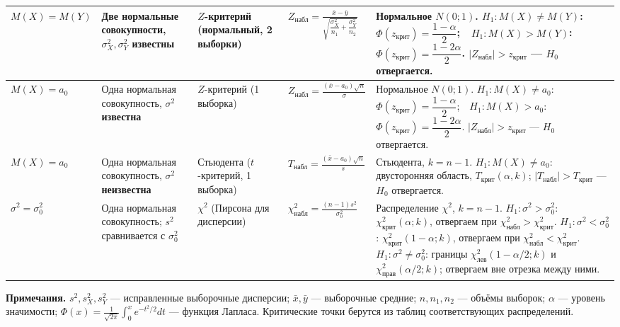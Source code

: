 \documentclass[a4paper,landscape,9pt]{extarticle}
\newcommand{\kr}{\text{крит}}
\newcommand{\nab}{\text{набл}}
\begin{document}
\begin{tabular}{@{}P{2.4cm}P{3.7cm}P{2.7cm}P{6.3cm}P{9.3cm}@{}}
\midrule
$M(X)=M(Y)$ &
Две нормальные совокупности, $\sigma_X^2,\sigma_Y^2$ \textbf{известны} &
$Z$-критерий (нормальный, 2 выборки) &
$\displaystyle Z_{\nab}=\frac{\bar x-\bar y}{\sqrt{\dfrac{\sigma_X^2}{n_1}+\dfrac{\sigma_Y^2}{n_2}}}$ &
Нормальное $N(0;1)$. $H_1: M(X)\ne M(Y)$: $\Phi(z_{\kr})=\dfrac{1-\alpha}{2}$;\ \ $H_1: M(X)>M(Y)$: $\Phi(z_{\kr})=\dfrac{1-2\alpha}{2}$.\newline
$|Z_{\nab}|>z_{\kr}$ --- $H_0$ отвергается. \\
\midrule
$M(X)=a_0$ &
Одна нормальная совокупность, $\sigma^2$ \textbf{известна} &
$Z$-критерий (1 выборка) &
$\displaystyle Z_{\nab}=\frac{(\bar x-a_0)\sqrt n}{\sigma}$ &
Нормальное $N(0;1)$. $H_1: M(X)\ne a_0$: $\Phi(z_{\kr})=\dfrac{1-\alpha}{2}$;\ \ $H_1: M(X)>a_0$: $\Phi(z_{\kr})=\dfrac{1-2\alpha}{2}$.\newline
$|Z_{\nab}|>z_{\kr}$ --- $H_0$ отвергается. \\
\midrule
$M(X)=a_0$ &
Одна нормальная совокупность, $\sigma^2$ \textbf{неизвестна} &
Стьюдента ($t$-критерий, 1 выборка) &
$\displaystyle T_{\nab}=\frac{(\bar x-a_0)\sqrt n}{s}$ &
Стьюдента, $k=n-1$. $H_1: M(X)\ne a_0$: двусторонняя область, $T_{\kr}(\alpha,k)$; $|T_{\nab}|>T_{\kr}$ --- $H_0$ отвергается. \\
\midrule
$\sigma^2=\sigma_0^2$ &
Одна нормальная совокупность; $s^2$ сравнивается с $\sigma_0^2$ &
$\chi^2$ (Пирсона для дисперсии) &
$\displaystyle \chi^2_{\nab}=\frac{(n-1)s^2}{\sigma_0^2}$ &
Распределение $\chi^2$, $k=n-1$.\newline
$H_1:\sigma^2>\sigma_0^2$: $\chi^2_{\kr}(\alpha;k)$, отвергаем при $\chi^2_{\nab}>\chi^2_{\kr}$.\newline
$H_1:\sigma^2<\sigma_0^2$: $\chi^2_{\kr}(1-\alpha;k)$, отвергаем при $\chi^2_{\nab}<\chi^2_{\kr}$.\newline
$H_1:\sigma^2\ne\sigma_0^2$: границы $\chi^2_{\text{лев}}(1-\alpha/2;k)$ и $\chi^2_{\text{прав}}(\alpha/2;k)$; отвергаем вне отрезка между ними. \\
\bottomrule
\end{tabular}

\vspace{4pt}
{\scriptsize\textbf{Примечания.} $s^2,s_X^2,s_Y^2$ --- исправленные выборочные дисперсии; $\bar x,\bar y$ --- выборочные средние; $n,n_1,n_2$ --- объёмы выборок; $\alpha$ --- уровень значимости; $\Phi(x)=\frac1{\sqrt{2\pi}}\int_0^x e^{-t^2/2}dt$ --- функция Лапласа. Критические точки берутся из таблиц соответствующих распределений.}
\end{document}
